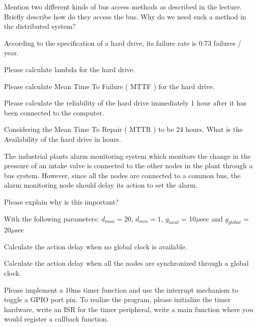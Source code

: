 
Mention two different kinds of bus access methods as described in the lecture. Briefly describe how do they access the bus. Why do we need such a method in the distributed system?


According to the specification of a hard drive, its failure rate is 0.73 failures / year.
\begin{unteraufgaben}
\item Please calculate lambda for the hard drive.
\item Please calculate Mean Time To Failure ( MTTF ) for the hard drive.
\item Please calculate the reliability of the hard drive immediately 1 hour after it has been connected to the computer.
\item Considering the Mean Time To Repair ( MTTR )  to be 24 hours. What is the Availability of the hard drive in hours.

\end{unteraufgaben}



The industrial plants alarm monitoring system which monitors the change in the pressure of an intake valve is connected to the other nodes in the plant through a bus system. However, since all the nodes are connected to a common bus, the alarm monitoring node should delay its action to set the alarm. 
\begin{unteraufgaben}
\item Please explain why is this important?
\item With the following parameters: $d_{max} = 20$, $d_{min} = 1$, $g_{local}$ = 10$\mu$sec and $g_{global}$ = 20$\mu$sec
\begin{compactenum}[a]
\item Calculate the action delay when no global clock is available.
\item Calculate the action delay when all the nodes are synchronized through a global clock.
\end{compactenum}
\end{unteraufgaben}




Please implement a 10ms timer function and use the interrupt mechanism to toggle a GPIO port pin. To realize the program, please initialize the timer hardware, write an ISR for the timer peripheral, write a main function where you would register a callback function.

